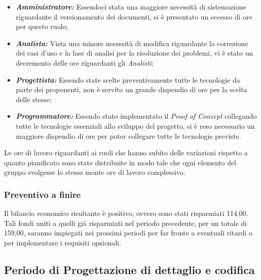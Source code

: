 \begin{itemize}
    \item \textbf{\textit{Amministratore:}} Essendoci stata una maggiore necessità di sistemazione riguardante il versionamento dei documenti, si è presentato un eccesso di ore per questo ruolo;
    \item \textbf{\textit{Analista:}} Vista una minore necessità di modifica riguardante la correzione dei casi d'uso e la fase di analisi per la risoluzione dei problemi, vi è stato un decremento delle ore riguardanti gli \textit{Analisti};
    \item \textbf{\textit{Progettista:}} Essendo state scelte preventivamente tutte le tecnologie da parte dei proponenti, non è servito un grande dispendio di ore per la scelta delle stesse;
    \item \textbf{\textit{Programmatore:}} Essendo stato implementato il \textit{Proof of Concept} collegando tutte le tecnologie essenziali allo sviluppo del progetto, si è reso necessario un maggiore dispendio di ore per poter collegare tutte le tecnologie previste.
\end{itemize}

Le ore di lavoro riguardanti ai ruoli che hanno subito delle variazioni rispetto a quanto pianificato sono state distribuite in modo tale che ogni elemento del gruppo svolgesse lo stesso monte ore di lavoro complessivo.

\subsubsection{Preventivo a finire} Il bilancio economico risultante è positivo, ovvero sono stati risparmiati 114,00\EURdig. Tali fondi uniti a quelli già risparmiati nel periodo precedente, per un totale di 159,00\EurDig, saranno impiegati nei prossimi periodi per far fronte a eventuali ritardi o per implementare i requisiti opzionali.


\newpage
\subsection{Periodo di Progettazione di dettaglio e codifica}
